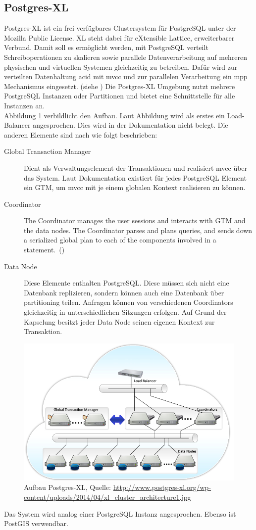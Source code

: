 \subsection{Postgres-XL}
Postgres-XL ist ein frei verfügbares Clustersystem für PostgreSQL unter der Mozilla Public License.
XL steht dabei für eXtensible Lattice, erweiterbarer Verbund.
Damit soll es ermöglicht werden, mit PostgreSQL verteilt Schreiboperationen zu skalieren sowie parallele Datenverarbeitung auf mehreren physischen und virtuellen Systemen gleichzeitig zu betreiben.
Dafür wird zur verteilten Datenhaltung \Gls{acid} mit \Gls{mvcc} und zur parallelen Verarbeitung ein \Gls{mpp} Mechanismus eingesetzt. (siehe \cite{website:postgresxl-about})
Die Postgres-XL Umgebung nutzt mehrere PostgreSQL Instanzen oder Partitionen und bietet eine Schnittstelle für alle Instanzen an.\\
Abbildung \ref{fig:postgresxl} verbildlicht den Aufbau.
Laut Abbildung wird als erstes ein Load-Balancer angesprochen.
Dies wird in der Dokumentation nicht belegt.
Die anderen Elemente sind nach \cite{website:postgresxl-about} wie folgt beschrieben:
\begin{description}
\item[Global Transaction Manager] Dient als Verwaltungselement der Transaktionen und realisiert \Gls{mvcc} über das System. Laut Dokumentation existiert für jedes PostgreSQL Element ein GTM, um \Gls{mvcc}  mit je einem globalen Kontext realisieren zu können.
\item[Coordinator] \glqq The Coordinator manages the user sessions and interacts with GTM and the data nodes. The Coordinator parses and plans queries, and sends down a serialized global plan to each of the components involved in a statement.\grqq\ (\cite{website:postgresxl-overview})
\item[Data Node] Diese Elemente enthalten PostgreSQL. Diese müssen sich nicht eine Datenbank replizieren, sondern können auch eine Datenbank über partitioning teilen. Anfragen können von verschiedenen Coordinators gleichzeitig in unterschiedlichen Sitzungen erfolgen. Auf Grund der Kapselung besitzt jeder Data Node seinen eigenen Kontext zur Transaktion.
\end{description}
\begin{figure}[h]
\centering
\includegraphics[width=.7\textwidth]{Abbildungen/postgresxl-structure.jpg}
\caption[Aufbau Postgres-XL]{Aufbau Postgres-XL, Quelle: \url{http://www.postgres-xl.org/wp-content/uploads/2014/04/xl_cluster_architecture1.jpg}}
\label{fig:postgresxl}
\end{figure}
Das System wird analog einer PostgreSQL Instanz angesprochen.
Ebenso ist PostGIS verwendbar.

